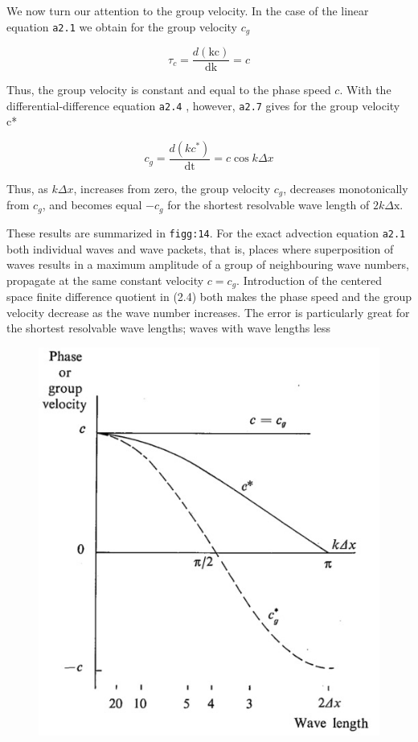 We now turn our attention to the group velocity. In the case of the
linear equation \texttt{a2.1} we obtain for the group velocity \(c_{g}\)

 \[\tau_{c} = \frac{d\left( \text{kc} \right)}{\text{dk}} = c\]

Thus, the group velocity is constant and equal to the phase speed \(c\).
With the differential-difference equation \texttt{a2.4} , however,
\texttt{a2.7} gives for the group velocity c*

 \[c_{g} = \frac{d\left( kc^{*} \right)}{\text{dt}} = c\cos{k\Delta x}\]

Thus, as \(k\Delta x\), increases from zero, the group velocity
\(c_{g}\), decreases monotonically from \(c_{g}\), and becomes equal
\({- c}_{g}\) for the shortest resolvable wave length of
\(2k\Delta\text{x.}\)

These results are summarized in \texttt{figg:14}. For the exact
advection equation \texttt{a2.1} both individual waves and wave packets,
that is, places where superposition of waves results in a maximum
amplitude of a group of neighbouring wave numbers, propagate at the same
constant velocity \(c = c_{g}\). Introduction of the centered space
finite difference quotient in (2.4) both makes the phase speed and the
group velocity decrease as the wave number increases. The error is
particularly great for the shortest resolvable wave lengths; waves with
wave lengths less

\begin{figure}
 \centering
 \includegraphics[width = .7 \textwidth]{figs/NM/pic14.jpg}
 \caption{} \label{fig:}
\end{figure}


